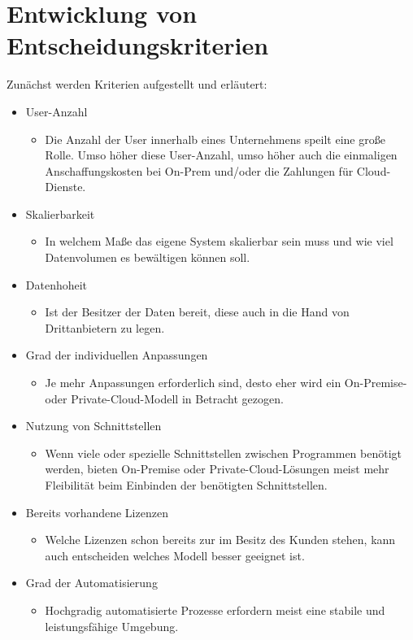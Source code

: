 \documentclass[12pt,bibtotoc]{article}
\begin{document}
			\section{Entwicklung von Entscheidungskriterien}
	Zunächst werden Kriterien aufgestellt und erläutert:
	\begin{itemize}
		\item User-Anzahl %
		\begin{itemize}
			\item Die Anzahl der User innerhalb eines Unternehmens speilt eine große Rolle. Umso höher diese User-Anzahl, umso höher auch die einmaligen Anschaffungskosten bei On-Prem und/oder die Zahlungen für Cloud-Dienste.
		\end{itemize}
		\item Skalierbarkeit 
			\begin{itemize}
				\item In welchem Maße das eigene System skalierbar sein muss und wie viel Datenvolumen es bewältigen können soll.
			\end{itemize}
		\item Datenhoheit %
			\begin{itemize}
				\item Ist der Besitzer der Daten bereit, diese auch in die Hand von Drittanbietern zu legen.
			\end{itemize}
		\item Grad der individuellen Anpassungen %
			\begin{itemize}
				\item Je mehr Anpassungen erforderlich sind, desto eher wird ein On-Premise- oder Private-Cloud-Modell in Betracht gezogen.
			\end{itemize}
		\item Nutzung von Schnittstellen %
			\begin{itemize}
				\item Wenn viele oder spezielle Schnittstellen zwischen Programmen benötigt werden, bieten On-Premise oder Private-Cloud-Lösungen meist mehr Fleibilität beim Einbinden der benötigten Schnittstellen.
			\end{itemize}
		\item Bereits vorhandene Lizenzen %
			\begin{itemize}
				\item Welche Lizenzen schon bereits zur im Besitz des Kunden stehen, kann auch entscheiden welches Modell besser geeignet ist. 
			\end{itemize}
		\item Grad der Automatisierung %
			\begin{itemize}
				\item Hochgradig automatisierte Prozesse erfordern meist eine stabile und leistungsfähige Umgebung. 
			\end{itemize}
	\end{itemize}
\end{document}
